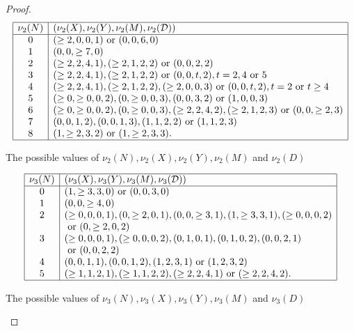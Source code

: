 \begin{proof}
\begin{table}[h]
$$
\begin{array}{|c|l|} \hline
\nu_2 (N) & (\nu_2 (X), \nu_2 (Y), \nu_2 (M), \nu_2 (\mathcal{D}) ) \\ \hline
0 &  (\geq 2, 0, 0, 1)  \mbox{ or } (0,0,6, 0)  \\
1 & (0,0,\geq 7, 0)  \\
2 & (\geq 2, 2, 4, 1), (\geq 2, 1, 2, 2) \mbox{ or } (0,0,2, 2) \\
3 & (\geq 2, 2, 4, 1), (\geq 2, 1, 2, 2)  \mbox{ or }  (0,0,t, 2), t= 2, 4 \mbox{ or } 5  \\
4 &  (\geq 2, 2, 4, 1), (\geq 2, 1, 2, 2), (\geq 2, 0, 0, 3)  \mbox{ or }  (0,0,t, 2), t= 2 \mbox{ or } t \geq 4  \\
5 & (\geq 0, \geq 0, 0, 2), (0, \geq 0, 0, 3), (0,0,3, 2) \mbox{ or } (1,0,0, 3)  \\
6 & (\geq 0, \geq 0, 0, 2), (0, \geq 0, 0, 3), (\geq 2, 2, 4, 2), (\geq 2, 1, 2, 3) \mbox{ or }  (0,0,\geq 2, 3) \\
7 & (0,0,1,2), (0,0,1,3), (1,1,2,2) \mbox{ or } (1,1,2,3) \\
8 & (1, \geq 2, 3, 2) \mbox{ or } (1, \geq 2, 3, 3). \\
 \hline
\end{array}
$$
\caption{The possible values of $\nu_2(N), \nu_2 (X), \nu_2 (Y), \nu_2(M)$ and $\nu_2 (D)$}
\label{tab nu2 nxym}
\end{table}

\begin{table}[h]
$$
\begin{array}{|c|l|} \hline
\nu_3 (N) & (\nu_3 (X), \nu_3 (Y), \nu_3 (M), \nu_3 (\mathcal{D}) ) \\ \hline
0 & (1, \geq 3, 3, 0)  \mbox{ or } (0,0,3, 0)  \\
1 & (0,0,\geq 4, 0)  \\
2 & (\geq 0, 0, 0, 1), (0, \geq 2, 0, 1), (0,0, \geq 3, 1), (1, \geq 3, 3, 1), (\geq 0,0,0,2)  \\
 & \mbox{ or } (0,\geq 2, 0, 2) \\
3 & (\geq 0, 0, 0, 1),  (\geq 0, 0, 0, 2), (0,1,0, 1), (0,1,0, 2), (0,0,2,1)\\
 &  \mbox{ or } (0,0,2, 2) \\
4 &  (0,0,1,1), (0,0,1,2), (1,2,3,1) \mbox{ or } (1, 2, 3, 2) \\
5 &   (\geq 1, 1, 2, 1), (\geq 1, 1, 2, 2), (\geq 2, 2, 4, 1) \mbox{ or }  (\geq 2, 2, 4,2). \\
 \hline
\end{array}
$$
\caption{The possible values of $\nu_3(N), \nu_3(X), \nu_3 (Y), \nu_3(M)$ and $\nu_3 (D)$}
\label{tab nu3 nxym}
\end{table}


\end{proof}
